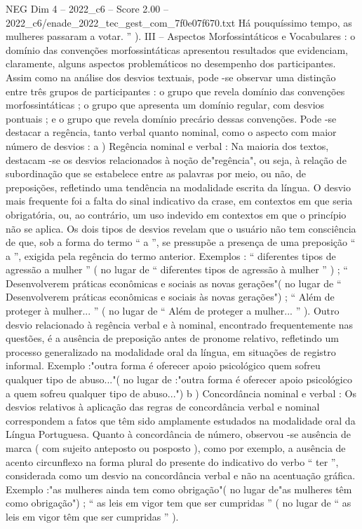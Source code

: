 \begin{textsample}{NEG Dim 4 – 2022\_c6 – Score 2.00 – 2022\_c6/enade\_2022\_tec\_gest\_com\_7f0e07f670.txt}
Há pouquíssimo tempo, as mulheres passaram a votar. ” ).
III – Aspectos Morfossintáticos e Vocabulares : o domínio das convenções morfossintáticas apresentou resultados que evidenciam, claramente, alguns aspectos problemáticos no desempenho dos participantes.
Assim como na análise dos desvios textuais, pode -se observar uma distinção entre três grupos de participantes : o grupo que revela domínio das convenções morfossintáticas ; o grupo que apresenta um domínio regular, com desvios pontuais ; e o grupo que revela domínio precário dessas convenções.
Pode -se destacar a regência, tanto verbal quanto nominal, como o aspecto com maior número de desvios : a ) Regência nominal e verbal : Na maioria dos textos, destacam -se os desvios relacionados à noção de"regência", ou seja, à relação de subordinação que se estabelece entre as palavras por meio, ou não, de preposições, refletindo uma tendência na modalidade escrita da língua.
O desvio mais frequente foi a falta do sinal indicativo da crase, em contextos em que seria obrigatória, ou, ao contrário, um uso indevido em contextos em que o princípio não se aplica.
Os dois tipos de desvios revelam que o usuário não tem consciência de que, sob a forma do termo “ a ”, se pressupõe a presença de uma preposição “ a ”, exigida pela regência do termo anterior.
Exemplos : “ diferentes tipos de agressão a mulher ” ( no lugar de “ diferentes tipos de agressão à mulher ” ) ; “ Desenvolverem práticas econômicas e sociais as novas gerações"( no lugar de “ Desenvolverem práticas econômicas e sociais às novas gerações") ; “ Além de proteger à mulher... ” ( no lugar de “ Além de proteger a mulher... ” ).
Outro desvio relacionado à regência verbal e à nominal, encontrado frequentemente nas questões, é a ausência de preposição antes de pronome relativo, refletindo um processo generalizado na modalidade oral da língua, em situações de registro informal.
Exemplo :"outra forma é oferecer apoio psicológico quem sofreu qualquer tipo de abuso..."( no lugar de :"outra forma é oferecer apoio psicológico a quem sofreu qualquer tipo de abuso...") b ) Concordância nominal e verbal : Os desvios relativos à aplicação das regras de concordância verbal e nominal correspondem a fatos que têm sido amplamente estudados na modalidade oral da Língua Portuguesa.
Quanto à concordância de número, observou -se ausência de marca ( com sujeito anteposto ou posposto ), como por exemplo, a ausência de acento circunflexo na forma plural do presente do indicativo do verbo “ ter ”, considerada como um desvio na concordância verbal e não na acentuação gráfica.
Exemplo :"as mulheres ainda tem como obrigação"( no lugar de"as mulheres têm como obrigação") ; “ as leis em vigor tem que ser cumpridas ” ( no lugar de “ as leis em vigor têm que ser cumpridas ” ).

\end{textsample}
